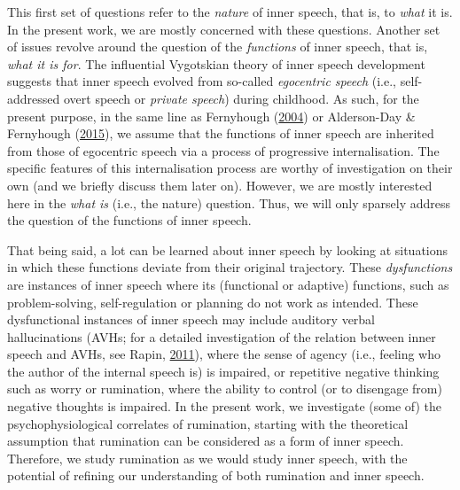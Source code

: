 \documentclass[a4paper,12pt,twoside,onecolumn,openright,final,oldfontcommands]{memoir}
\begin{document}
This first set of questions refer to the \emph{nature} of inner speech, that is, to \emph{what} it is. In the present work, we are mostly concerned with these questions. Another set of issues revolve around the question of the \emph{functions} of inner speech, that is, \emph{what it is for}. The influential Vygotskian theory of inner speech development suggests that inner speech evolved from so-called \emph{egocentric speech} (i.e., self-addressed overt speech or \emph{private speech}) during childhood. As such, for the present purpose, in the same line as Fernyhough (\protect\hyperlink{ref-fernyhough_alien_2004}{2004}) or Alderson-Day \& Fernyhough (\protect\hyperlink{ref-alderson-day_inner_2015}{2015}), we assume that the functions of inner speech are inherited from those of egocentric speech via a process of progressive internalisation. The specific features of this internalisation process are worthy of investigation on their own (and we briefly discuss them later on). However, we are mostly interested here in the \emph{what is} (i.e., the nature) question. Thus, we will only sparsely address the question of the functions of inner speech.

That being said, a lot can be learned about inner speech by looking at situations in which these functions deviate from their original trajectory. These \emph{dysfunctions} are instances of inner speech where its (functional or adaptive) functions, such as problem-solving, self-regulation or planning do not work as intended. These dysfunctional instances of inner speech may include auditory verbal hallucinations (AVHs; for a detailed investigation of the relation between inner speech and AVHs, see Rapin, \protect\hyperlink{ref-Rapin2011}{2011}), where the sense of agency (i.e., feeling who the author of the internal speech is) is impaired, or repetitive negative thinking such as worry or rumination, where the ability to control (or to disengage from) negative thoughts is impaired. In the present work, we investigate (some of) the psychophysiological correlates of rumination, starting with the theoretical assumption that rumination can be considered as a form of inner speech. Therefore, we study rumination as we would study inner speech, with the potential of refining our understanding of both rumination and inner speech.
\end{document}
